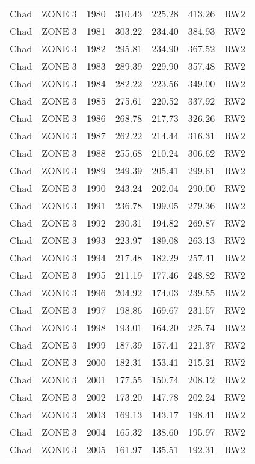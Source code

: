 \begin{longtable}{lllrrrl}
  Chad & ZONE 3 & 1980 & 310.43 & 225.28 & 413.26 & RW2 \\ 
  Chad & ZONE 3 & 1981 & 303.22 & 234.40 & 384.93 & RW2 \\ 
  Chad & ZONE 3 & 1982 & 295.81 & 234.90 & 367.52 & RW2 \\ 
  Chad & ZONE 3 & 1983 & 289.39 & 229.90 & 357.48 & RW2 \\ 
  Chad & ZONE 3 & 1984 & 282.22 & 223.56 & 349.00 & RW2 \\ 
  Chad & ZONE 3 & 1985 & 275.61 & 220.52 & 337.92 & RW2 \\ 
  Chad & ZONE 3 & 1986 & 268.78 & 217.73 & 326.26 & RW2 \\ 
  Chad & ZONE 3 & 1987 & 262.22 & 214.44 & 316.31 & RW2 \\ 
  Chad & ZONE 3 & 1988 & 255.68 & 210.24 & 306.62 & RW2 \\ 
  Chad & ZONE 3 & 1989 & 249.39 & 205.41 & 299.61 & RW2 \\ 
  Chad & ZONE 3 & 1990 & 243.24 & 202.04 & 290.00 & RW2 \\ 
  Chad & ZONE 3 & 1991 & 236.78 & 199.05 & 279.36 & RW2 \\ 
  Chad & ZONE 3 & 1992 & 230.31 & 194.82 & 269.87 & RW2 \\ 
  Chad & ZONE 3 & 1993 & 223.97 & 189.08 & 263.13 & RW2 \\ 
  Chad & ZONE 3 & 1994 & 217.48 & 182.29 & 257.41 & RW2 \\ 
  Chad & ZONE 3 & 1995 & 211.19 & 177.46 & 248.82 & RW2 \\ 
  Chad & ZONE 3 & 1996 & 204.92 & 174.03 & 239.55 & RW2 \\ 
  Chad & ZONE 3 & 1997 & 198.86 & 169.67 & 231.57 & RW2 \\ 
  Chad & ZONE 3 & 1998 & 193.01 & 164.20 & 225.74 & RW2 \\ 
  Chad & ZONE 3 & 1999 & 187.39 & 157.41 & 221.37 & RW2 \\ 
  Chad & ZONE 3 & 2000 & 182.31 & 153.41 & 215.21 & RW2 \\ 
  Chad & ZONE 3 & 2001 & 177.55 & 150.74 & 208.12 & RW2 \\ 
  Chad & ZONE 3 & 2002 & 173.20 & 147.78 & 202.24 & RW2 \\ 
  Chad & ZONE 3 & 2003 & 169.13 & 143.17 & 198.41 & RW2 \\ 
  Chad & ZONE 3 & 2004 & 165.32 & 138.60 & 195.97 & RW2 \\ 
  Chad & ZONE 3 & 2005 & 161.97 & 135.51 & 192.31 & RW2 \\ 

\end{longtable}
